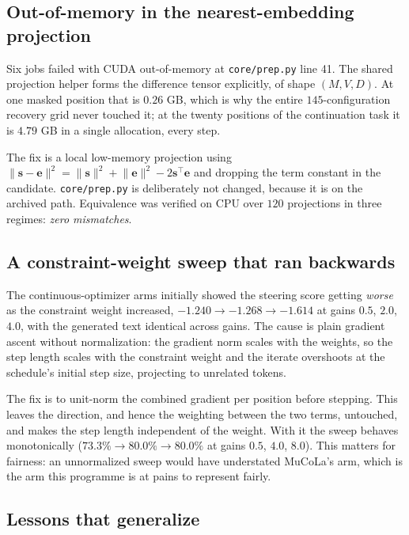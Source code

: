\documentclass[11pt,a4paper]{article}
\newcommand{\ve}{\bm{e}}
\newcommand{\vs}{\bm{s}}
\newcommand{\file}[1]{\texttt{\small #1}}
\begin{document}
\subsection{Out-of-memory in the nearest-embedding projection}

Six jobs failed with CUDA out-of-memory at \file{core/prep.py} line 41. The shared
projection helper forms the difference tensor explicitly, of shape
$(M, V, D)$. At one masked position that is $0.26$ GB, which is why the entire
$145$-configuration recovery grid never touched it; at the twenty positions of the
continuation task it is $4.79$ GB in a single allocation, every step.

The fix is a local low-memory projection using $\lVert \vs - \ve \rVert^2 =
\lVert \vs\rVert^2 + \lVert \ve\rVert^2 - 2\vs^\top\ve$ and dropping the term constant in
the candidate. \file{core/prep.py} is deliberately not changed, because it is on the
archived path. Equivalence was verified on CPU over $120$ projections in three regimes:
\emph{zero mismatches}.

\subsection{A constraint-weight sweep that ran backwards}

The continuous-optimizer arms initially showed the steering score getting \emph{worse} as
the constraint weight increased, $-1.240 \to -1.268 \to -1.614$ at gains $0.5$, $2.0$,
$4.0$, with the generated text identical across gains. The cause is plain gradient ascent
without normalization: the gradient norm scales with the weights, so the step length
scales with the constraint weight and the iterate overshoots at the schedule's initial
step size, projecting to unrelated tokens.

The fix is to unit-norm the combined gradient per position before stepping. This leaves
the direction, and hence the weighting between the two terms, untouched, and makes the
step length independent of the weight. With it the sweep behaves monotonically
($73.3\% \to 80.0\% \to 80.0\%$ at gains $0.5$, $4.0$, $8.0$). This matters for fairness:
an unnormalized sweep would have understated MuCoLa's arm, which is the arm this
programme is at pains to represent fairly.

\subsection{Lessons that generalize}
\end{document}
